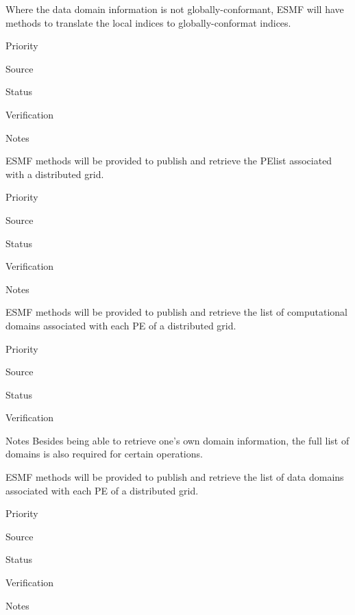Where the data domain information is not globally-conformant, 
ESMF will have methods to translate the local indices to
globally-conformat indices.

\begin{reqlist}
\item[Priority]
\item[Source]
\item[Status]
\item[Verification]
\item[Notes]
\end{reqlist}



ESMF methods will be provided to publish and retrieve the PElist
associated with a distributed grid.

\begin{reqlist}
\item[Priority]
\item[Source]
\item[Status]
\item[Verification]
\item[Notes]
\end{reqlist}


ESMF methods will be provided to publish and retrieve the list of
computational domains associated with each PE of a distributed grid.

\begin{reqlist}
\item[Priority]
\item[Source]
\item[Status]
\item[Verification]
\item[Notes] Besides being able to retrieve one's own domain
  information, the full list of domains is also required for certain
  operations.
\end{reqlist}


ESMF methods will be provided to publish and retrieve the list of
data domains associated with each PE of a distributed grid.

\begin{reqlist}
\item[Priority]
\item[Source]
\item[Status]
\item[Verification]
\item[Notes]
\end{reqlist}

